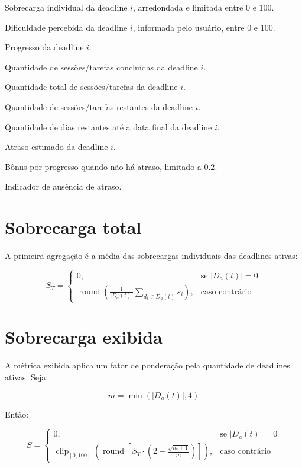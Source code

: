 \documentclass[12pt,a4paper]{article}
\begin{document}
\begin{description}[leftmargin=2.2cm]
    \item[$s_i$] Sobrecarga individual da deadline $i$, arredondada e limitada entre $0$ e $100$.
    \item[$q_i$] Dificuldade percebida da deadline $i$, informada pelo usuário, entre $0$ e $100$.
    \item[$p_i$] Progresso da deadline $i$.
    \item[$c_i$] Quantidade de sessões/tarefas concluídas da deadline $i$.
    \item[$n_i$] Quantidade total de sessões/tarefas da deadline $i$.
    \item[$r_i$] Quantidade de sessões/tarefas restantes da deadline $i$.
    \item[$\Delta_i$] Quantidade de dias restantes até a data final da deadline $i$.
    \item[$a_i$] Atraso estimado da deadline $i$.
    \item[$b_i$] Bônus por progresso quando não há atraso, limitado a $0.2$.
    \item[$k_i$] Indicador de ausência de atraso.
\end{description}

\section{Sobrecarga total}

A primeira agregação é a média das sobrecargas individuais das deadlines ativas:

\[
S_T =
\begin{cases}
0, & \text{se } |D_a(t)| = 0 \\
\operatorname{round}
\left(
\frac{1}{|D_a(t)|}
\sum_{d_i \in D_a(t)} s_i
\right), & \text{caso contrário}
\end{cases}
\]

\section{Sobrecarga exibida}

A métrica exibida aplica um fator de ponderação pela quantidade de deadlines ativas. Seja:

\[
m = \min(|D_a(t)|, 4)
\]

Então:

\[
S =
\begin{cases}
0, & \text{se } |D_a(t)| = 0 \\
\operatorname{clip}_{[0,100]}
\left(
\operatorname{round}
\left[
S_T
\cdot
\left(
2 - \frac{\sqrt{m+1}}{m}
\right)
\right]
\right), & \text{caso contrário}
\end{cases}
\]
\end{document}
